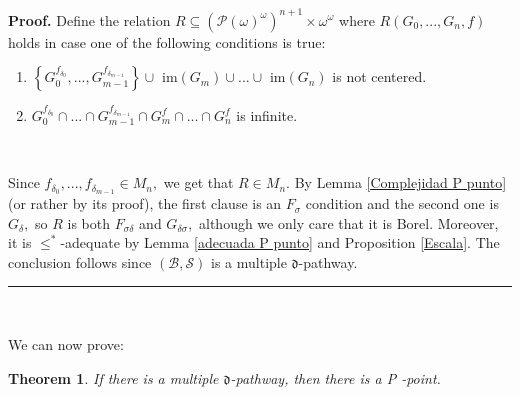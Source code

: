 \documentclass{article}%
\newtheorem{theorem}{Theorem}
\newenvironment{proof}[1][Proof]{\noindent\textbf{#1.} }{\ \rule{0.5em}{0.5em}}
\begin{document}
\begin{proof}
Define the relation $R\subseteq\left(  \mathcal{P}\left(  \omega\right)
^{\omega}\right)  ^{n+1}\times\omega^{\omega}$ where $R(G_{0},...,G_{n},f)$
holds in case one of the following conditions is true:

\begin{enumerate}
\item $\left\{  G_{0}^{f_{\delta_{0}}},...,G_{m-1}^{f_{\delta_{m-1}}}\right\}
\cup$ \textsf{im}$\left(  G_{m}\right)  \cup...\cup$ \textsf{im}$\left(
G_{n}\right)  $ is not centered.

\item $G_{0}^{f_{\delta_{0}}}\cap...\cap G_{m-1}^{f_{\delta_{m-1}}}\cap
G_{m}^{f}\cap...\cap G_{n}^{f}$ is infinite.
\end{enumerate}

\qquad\ \ \ 

Since $f_{\delta_{0}},...,f_{\delta_{m-1}}\in M_{n},$ we get that $R\in
M_{n}.$ By Lemma \ref{Complejidad P punto} (or rather by its proof), the first
clause is an $F_{\sigma}$ condition and the second one is $G_{\delta},$ so $R$
is both $F_{\sigma\delta}$ and $G_{\delta\sigma},$ although we only care that
it is Borel. Moreover, it is $\leq^{\ast}$-adequate by Lemma
\ref{adecuada P punto} and Proposition \ref{Escala}. The conclusion follows
since $\left(  \mathcal{B},\mathcal{S}\right)  $ is a multiple $\mathfrak{d}$-pathway.
\end{proof}

\qquad\ \ \qquad\ \ 

We can now prove:

\begin{theorem}
If there is a multiple $\mathfrak{d}$-pathway, then there is a \textsf{P}%
-point. \label{Teorema P punto}
\end{theorem}
\end{document}
